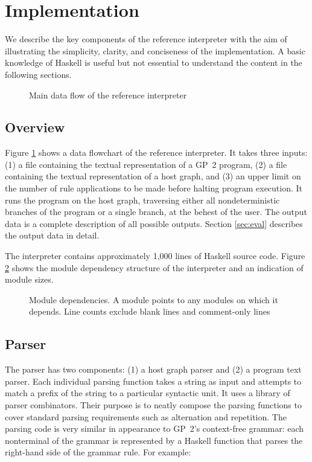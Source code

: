 \section{Implementation}
\label{sec:implementation}
We describe the key components of the reference interpreter with the aim of illustrating the simplicity, clarity, and conciseness of the implementation. A basic knowledge of Haskell is useful but not essential to understand the content in the following sections. 

\begin{figure}[h]
\centering

\caption{Main data flow of the reference interpreter} \label{fig:architecture}
\end{figure}

\subsection{Overview}
Figure \ref{fig:architecture} shows a data flowchart of the reference interpreter. It takes three inputs: (1) a file containing the textual representation of a GP~2 program, (2) a file containing the textual representation of a host graph, and (3) an upper limit on the number of rule applications to be made before halting program execution. It runs the program on the host graph, traversing either all nondeterministic branches of the program or a single branch, at the behest of the user. The output data is a complete description of all possible outputs. Section \ref{sec:eval} describes the output data in detail.

The interpreter contains approximately 1,000 lines of Haskell source code. Figure \ref{fig:modules} shows the module dependency structure of the interpreter and an indication of module sizes.  

\begin{figure}
\centering

\caption{Module dependencies. A module points to any modules on which it depends. Line counts exclude blank lines and comment-only lines} \label{fig:modules}
\end{figure}

\subsection{Parser}
The parser has two components: (1) a host graph parser and (2) a program text parser. Each individual parsing function takes a string as input and attempts to match a prefix of the string to a particular syntactic unit. It uses a library of parser combinators. Their purpose is to neatly compose the parsing functions to cover standard parsing requirements such as alternation and repetition. The parsing code is very similar in appearance to GP~2's context-free grammar: each nonterminal of the grammar is represented by a Haskell function that parses the right-hand side of the grammar rule. For example:

